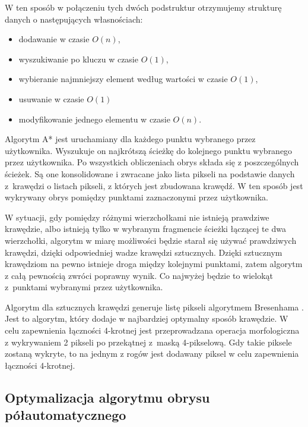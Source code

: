 \documentclass[a4paper,11pt,twoside,openright]{report}
\theoremstyle{definition}
\begin{document}
W ten sposób w połączeniu tych dwóch podstruktur otrzymujemy strukturę danych
o następujących własnościach:
\begin{itemize}[noitemsep]
\item dodawanie w czasie $O(n)$,
\item wyszukiwanie po kluczu w czasie $O(1)$,
\item wybieranie najmniejszy element według wartości w czasie $O(1)$,
\item usuwanie w czasie $O(1)$
\item modyfikowanie jednego elementu w czasie $O(n)$.
\end{itemize}

Algorytm A* jest uruchamiany dla każdego punktu wybranego przez użytkownika.
Wyszukuje on najkrótszą ścieżkę do kolejnego punktu wybranego przez użytkownika.
Po wszystkich obliczeniach obrys składa się z poszczególnych ścieżek. Są one
konsolidowane i zwracane jako lista pikseli na podstawie danych z~krawędzi o
listach pikseli, z których jest zbudowana krawędź. W ten sposób jest wykrywany
obrys pomiędzy punktami zaznaczonymi przez użytkownika.

W sytuacji, gdy pomiędzy różnymi wierzchołkami nie istnieją prawdziwe krawędzie,
albo istnieją tylko w wybranym fragmencie ścieżki łączącej te dwa wierzchołki,
algorytm w miarę możliwości będzie starał się używać prawdziwych krawędzi, dzięki
odpowiedniej wadze krawędzi sztucznych. Dzięki sztucznym krawędziom na pewno
istnieje droga między kolejnymi punktami, zatem algorytm z całą pewnością zwróci
poprawny wynik. Co najwyżej będzie to wielokąt z~punktami wybranymi przez użytkownika.

Algorytm dla sztucznych krawędzi generuje listę pikseli algorytmem Bresenhama
\cite{Bresenham}. Jest to algorytm, który dodaje w najbardziej optymalny sposób
krawędzie. W celu zapewnienia łączności 4-krotnej jest przeprowadzana operacja
morfologiczna z wykrywaniem 2 pikseli po przekątnej z~maską 4-pikselową. Gdy takie
piksele zostaną wykryte, to na jednym z rogów jest dodawany piksel w celu
zapewnienia łączności 4-krotnej.

\subsection {Optymalizacja algorytmu obrysu półautomatycznego}
\end{document}
